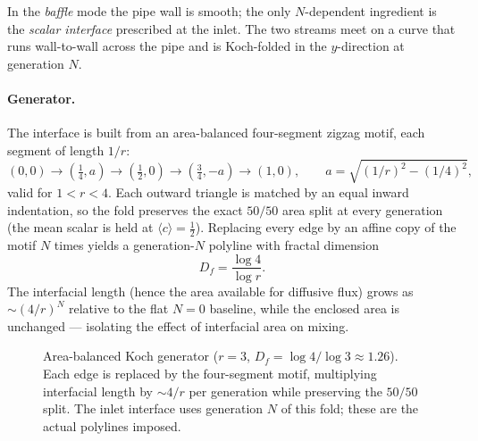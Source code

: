 \documentclass[11pt]{article}
\newcommand{\Df}{D_{\!f}}
\begin{document}
In the \emph{baffle} mode the pipe wall is smooth; the only $N$-dependent
ingredient is the \emph{scalar interface} prescribed at the inlet. The
two streams meet on a curve that runs wall-to-wall across the pipe and is
Koch-folded in the $y$-direction at generation $N$.

\paragraph{Generator.} The interface is built from an area-balanced
four-segment zigzag motif, each segment of length $1/r$:
\[
  (0,0)\to(\tfrac14, a)\to(\tfrac12,0)\to(\tfrac34,-a)\to(1,0),
  \qquad a = \sqrt{(1/r)^2 - (1/4)^2},
\]
valid for $1 < r < 4$. Each outward triangle is matched by an equal
inward indentation, so the fold preserves the exact $50/50$ area split at
every generation (the mean scalar is held at $\langle c\rangle = \tfrac12$).
Replacing every edge by an affine copy of the motif $N$ times yields a
generation-$N$ polyline with fractal dimension
\begin{equation}
  \Df = \frac{\log 4}{\log r}.
\end{equation}
The interfacial length (hence the area available for diffusive flux)
grows as $\sim (4/r)^{N}$ relative to the flat $N=0$ baseline, while the
enclosed area is unchanged --- isolating the effect of interfacial area
on mixing.

\begin{figure}[h]
\centering
{}
\caption{Area-balanced Koch generator ($r=3$, $\Df=\log4/\log3\approx1.26$).
Each edge is replaced by the four-segment motif, multiplying interfacial
length by $\sim 4/r$ per generation while preserving the $50/50$ split.
The inlet interface uses generation $N$ of this fold; these are the actual
polylines imposed.}
\label{fig:koch}
\end{figure}
\end{document}
